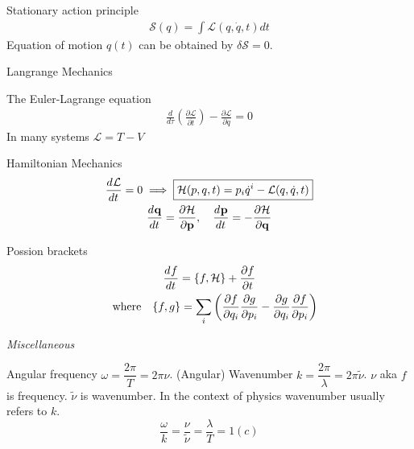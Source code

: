 \documentclass[main]{subfiles}
\begin{document}
\begin{multicols}{2}

Stationary action principle
\begin{gather}
    \mathcal{S}(q) = \int \mathcal{L}(q,\dot{q},t) dt
\end{gather}
Equation of motion $q(t)$ can be obtained by $\delta \mathcal{S} = 0$.

Langrange Mechanics

The Euler-Lagrange equation
\begin{gather}
    \boxed{
        \frac{d}{d\tau}\left(\frac{\partial \mathcal{L}}{\partial \dot t}\right) - \frac{\partial \mathcal{L}}{\partial q} = 0
    }
\end{gather}
In many systems $\mathcal{L} = T - V$

Hamiltonian Mechanics
\begin{gather}
    \frac{d^{}{\mathcal{L}}}{d{t}^{}} = 0 \implies \boxed{\mathcal{H}(p,q,t) = p_i\dot{q}^i - \mathcal{L}(q,\dot{q},t)}\\
    \frac{d^{}{\vb{q}}}{d{t}^{}} = \pdv{\mathcal{H}}{\vb{p}}, \quad \frac{d^{}{\vb{p}}}{d{t}^{}} = -\pdv{\mathcal{H}}{\vb{q}}
\end{gather}

Possion brackets
\begin{gather}
    \dv{f}{t} = \poissonbracket{f}{\mathcal{H}} + \pdv{f}{t}\\
    \qq{where}\poissonbracket{f}{g} = \sum_i\qty(\pdv{f}{q_i}\pdv{g}{p_i} - \pdv{g}{q_i}\pdv{f}{p_i})
\end{gather}


\end{multicols}

\textit{Miscellaneous}

Angular frequency $\omega = \dfrac{2\pi}{T} = 2\pi\nu$. (Angular) Wavenumber $k = \dfrac{2\pi}{\lambda} = 2\pi \tilde{\nu}$. $\nu$ aka $f$ is frequency. $\tilde{\nu}$ is wavenumber. In the context of physics wavenumber usually refers to $k$.
$$\frac{\omega}{k} = \frac{\nu}{\tilde{\nu}} = \frac{\lambda}{T}= 1(c)$$
\end{document}

